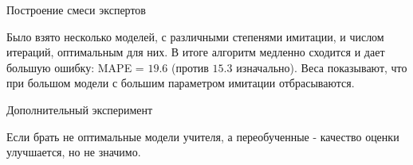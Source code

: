 \documentclass{beamer}
\begin{document}
\begin{frame}{Построение смеси экспертов}

Было взято несколько моделей, с различными степенями имитации, и числом итераций, оптимальным для них. В итоге алгоритм медленно сходится и дает большую ошибку:  MAPE = $19.6$ (против $15.3$ изначально). Веса показывают, что при большом модели с большим параметром имитации отбрасываются.   

\end{frame}

\begin{frame}{Дополнительный эксперимент}

Если брать не оптимальные модели учителя, а переобученные - качество оценки улучшается, но не значимо.


\begin{figure}[!htb]
\end{figure}


\end{frame}
\end{document}
